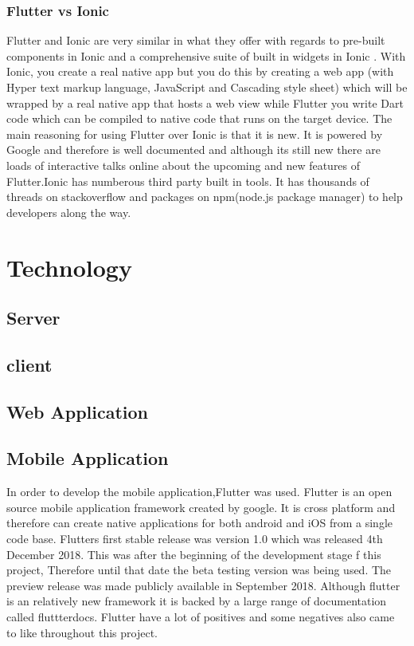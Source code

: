 \subsubsection{Flutter vs Ionic}
Flutter and Ionic are very similar in what they offer with regards to pre-built components in Ionic and a comprehensive suite of built in widgets in Ionic \cite{ReactVsFlutterVsIonic}. With Ionic, you create a real native app but you do this by creating a web app (with Hyper text markup language, JavaScript and Cascading style sheet) which will be wrapped by a real native app that hosts a web view while Flutter you write Dart code which can be compiled to native code that runs on the target device. The main reasoning for using Flutter over Ionic is that it is new. It is powered by Google and therefore is well documented and although its still new there are loads of interactive talks online about the upcoming and new features of Flutter.Ionic has numberous third party built in tools. It has thousands of threads on stackoverflow and packages on npm(node.js package manager) to help developers along the way.\cite{FlutterVS_2018}

\section{Technology}
\subsection{Server}

\subsection{client}
\subsection{Web Application}

\subsection{Mobile Application}
In order to develop the mobile application,Flutter was used. Flutter is an open source mobile application framework created by google. It is cross platform and therefore can create native applications for both android and iOS from a single code base. Flutters first stable release was version 1.0 which was released 4th December 2018. This was after the beginning of the development stage f this project, Therefore until that date the beta testing version was being used. The preview release was made publicly available in September 2018. Although flutter is an relatively new framework it is backed by a large range of documentation called fluttterdocs. Flutter have a lot of positives and some negatives also came to like throughout this project.

